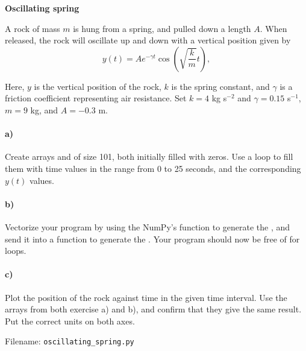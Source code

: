 \begin{Problem}{\textbf{Oscillating spring}}

\noindent A rock of mass $m$ is hung from a spring, and pulled down a length $A$. When
released, the rock will oscillate up and down with a
vertical position given by
\[
y(t) = A e^{-\gamma t}\cos\left(\sqrt{\frac{k}{m}}t\right),
\]

Here, $y$ is the vertical position of the rock, $k$ is the spring
constant, and $\gamma$ is a friction coefficient representing
air resistance. Set $k = 4$ kg s$^{-2}$ and $\gamma = 0.15$ s$^{-1}$,
$m = 9$ kg, and $A = -0.3$ m.
\paragraph{a)} Create arrays  and
 of size 101, both initially filled with zeros.
Use a  loop to fill them with time values in the range from 0 to 25 seconds, and the
corresponding $y(t)$ values.
\paragraph{b)} Vectorize your program by using the NumPy's 
function to generate the , and
send it into a function  to generate the . Your program should now be free of
for loops.
\paragraph{c)} Plot the position of the rock against time in the given time
interval. Use the arrays from both exercise a) and b), and confirm that they
give the same result. Put the correct units on both axes.

Filename: \texttt{oscillating\_spring.py}
\end{Problem}

